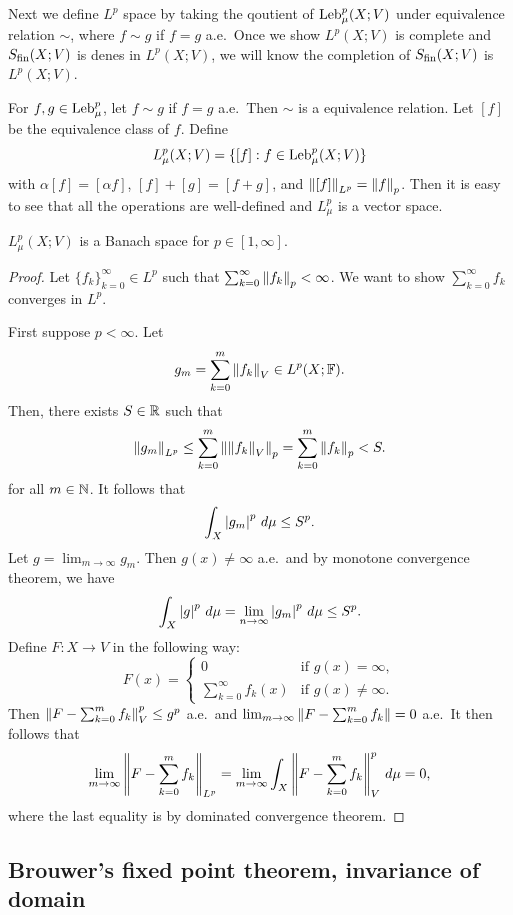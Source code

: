 \documentclass[a4paper]{article}
\renewcommand{\suminfk}{\sum_{k=0}^\infty}
\renewcommand{\seqinfk}[1]{\{ #1 \}_{k=0}^\infty}
\renewcommand{\sumk}{\sum_{k=0}}
\begin{document}
Next we define $L^p$ space by taking the qoutient of $\operatorname{Leb}_\mu^p (X; V)$
under equivalence relation $\sim$, where $f \sim g$ if $f = g$ a.e.\ Once
we show $L^p(X; V)$ is complete and $S_{\text{fin}}(X; V)$ is denes in $L^p(X; V)$,
we will know the completion of $S_{\text{fin}}(X; V)$ is $L^p(X; V)$.

\begin{defi}[$L^p$ spaces]
  For $f, g \in \operatorname{Leb}_\mu^p$, let $f \sim g$ if
  $f = g$ a.e.\ Then $\sim$ is a equivalence relation.
  Let $[f]$ be the equivalence class of $f$. Define
  \[
    L^p_\mu (X; V) = \{[f] : f \in \operatorname{Leb}_\mu^p (X; V)\}
  \]
  with $\alpha [f] = [\alpha f]$, $[f] + [g] = [f + g]$, and
  $\left\lVert [f]\right\rVert_{L^p} = \left\lVert f\right\rVert_p$. Then it is easy to see that all the
  operations are well-defined and $L^p_\mu$ is a vector space.
\end{defi}

\begin{thm}
  $L^p_\mu(X; V)$ is a Banach space for $p \in [1, \infty]$.
\end{thm}

\begin{proof}
  Let $\seqinfk{f_k} \in L^p$ such that $\suminfk \norm{f_k}_p < \infty$.
  We want to show $\suminfk f_k$ converges in $L^p$.

  First suppose $p < \infty$. Let
  \[
    g_m = \sumk^m \norm{f_k}_V \in L^p(X; \F).
  \]
  Then, there exists $S \in \mathbb{R}$ such that
  \[
    \norm{g_m}_{L^p} \leq \sumk^m \norm{\norm{f_k}_V}_p
    = \sumk^m \norm{f_k}_p < S.
  \]
  for all $m \in \mathbb{N}$. It follows that
  \[
    \int_X \left\lvert g_m\right\rvert^p \, d \mu \leq S^p.
  \]
  Let $g = \lim_{m \to \infty} g_m$. Then $g(x) \neq \infty$ a.e.\ and by
  monotone convergence theorem, we have
  \[
    \int_X \left\lvert g\right\rvert^p \, d \mu = \lim_{n \to \infty}
    \left\lvert g_m\right\rvert^p \, d \mu \leq S^p.
  \]
  Define $F: X \to V$ in the following way:
  \[
    F(x) = \begin{cases}
    0 & \text{if $g(x) = \infty$}, \\
    \suminfk f_k(x) & \text{if $g(x) \neq \infty$}.
    \end{cases}
  \]
  Then $\norm{F - \sumk^m f_k}_V^p \leq g^p$ a.e.\ and $\lim_{m \to
  \infty} \norm{F - \sumk^m f_k} = 0$ a.e.\ It then follows that
  \[
    \lim_{m \to \infty} \norm{F - \sumk^m f_k}_{L^p}
    = \lim_{m \to \infty} \int_X \norm{F - \sumk^m f_k}^p_V \d \mu
    = 0,
  \]
  where the last equality is by dominated convergence theorem.
\end{proof}

\subsection{Brouwer's fixed point theorem, invariance of domain}
\end{document}
